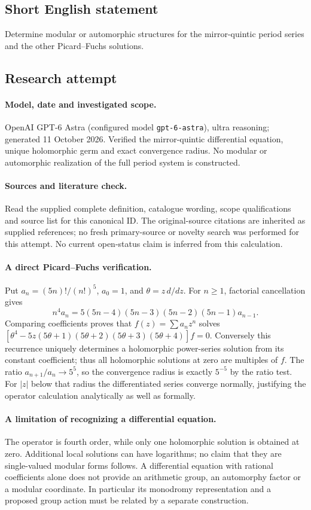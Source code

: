 \documentclass[11pt]{article}
\begin{document}
\subsection{Short English statement}
Determine modular or automorphic structures for the mirror-quintic period series and the other Picard–Fuchs solutions.
\subsection{Research attempt}
\paragraph{Model, date and investigated scope.}
OpenAI GPT-6 Astra (configured model \texttt{gpt-6-astra}), ultra reasoning; generated 11 October 2026. Verified the mirror-quintic differential equation, unique holomorphic germ and exact convergence radius. No modular or automorphic realization of the full period system is constructed.

\paragraph{Sources and literature check.}
Read the supplied complete definition, catalogue wording, scope qualifications and source list for this canonical ID. The original-source citations are inherited as supplied references; no fresh primary-source or novelty search was performed for this attempt. No current open-status claim is inferred from this calculation.

\paragraph{A direct Picard--Fuchs verification.}Put \(a_n=(5n)!/(n!)^5\), \(a_0=1\), and \(\theta=z\,d/dz\). For \(n\ge1\), factorial cancellation gives
\[n^4a_n=5(5n-4)(5n-3)(5n-2)(5n-1)a_{n-1}.
\]
Comparing coefficients proves that \(f(z)=\sum a_nz^n\) solves \([\theta^4-5z(5\theta+1)(5\theta+2)(5\theta+3)(5\theta+4)]f=0\). Conversely this recurrence uniquely determines a holomorphic power-series solution from its constant coefficient; thus all holomorphic solutions at zero are multiples of \(f\).
The ratio \(a_{n+1}/a_n\to5^5\), so the convergence radius is exactly \(5^{-5}\) by the ratio test. For \(|z|\) below that radius the differentiated series converge normally, justifying the operator calculation analytically as well as formally.
\paragraph{A limitation of recognizing a differential equation.}The operator is fourth order, while only one holomorphic solution is obtained at zero. Additional local solutions can have logarithms; no claim that they are single-valued modular forms follows. A differential equation with rational coefficients alone does not provide an arithmetic group, an automorphy factor or a modular coordinate. In particular its monodromy representation and a proposed group action must be related by a separate construction.
\end{document}
